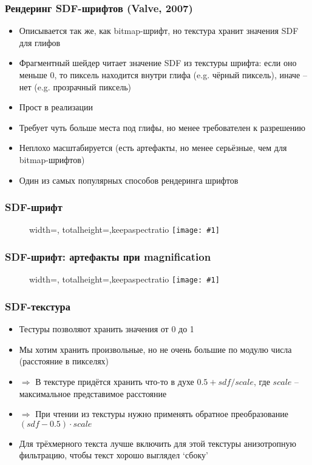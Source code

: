 \documentclass{beamer}
\newcommand{\slideimage}[1]{
  \begin{figure}
    \begin{adjustbox}{width=\textwidth, totalheight=\textheight-2\baselineskip-2\baselineskip,keepaspectratio}
      \texttt{[image: \#1]}
    \end{adjustbox}
  \end{figure}
}
\begin{document}
\begin{frame}[fragile]
\frametitle{Рендеринг SDF-шрифтов (Valve, 2007)}
\begin{itemize}
\item Описывается так же, как bitmap-шрифт, но текстура хранит значения SDF для глифов
\pause
\item Фрагментный шейдер читает значение SDF из текстуры шрифта: если оно меньше 0, то пиксель находится внутри глифа (e.g. чёрный пиксель), иначе -- нет (e.g. прозрачный пиксель)
\pause
\item Прост в реализации
\pause
\item Требует чуть больше места под глифы, но менее требователен к разрешению
\pause
\item Неплохо масштабируется (есть артефакты, но менее серьёзные, чем для bitmap-шрифтов)
\pause
\item Один из самых популярных способов рендеринга шрифтов
\end{itemize}
\end{frame}

\begin{frame}[fragile]
\frametitle{SDF-шрифт}
\slideimage{sdf-font.png}
\end{frame}

\begin{frame}[fragile]
\frametitle{SDF-шрифт: артефакты при magnification}
\slideimage{sdf-artifacts.jpg}
\end{frame}

\begin{frame}[fragile]
\frametitle{SDF-текстура}
\begin{itemize}
\item Тестуры позволяют хранить значения от 0 до 1
\pause
\item Мы хотим хранить произвольные, но не очень большие по модулю числа (расстояние в пикселях)
\pause
\item \begin{math}\Longrightarrow\end{math} В текстуре придётся хранить что-то в духе \begin{math}0.5 + sdf / scale\end{math}, где \begin{math}scale\end{math} -- максимальное представимое расстояние
\pause
\item \begin{math}\Longrightarrow\end{math} При чтении из текстуры нужно применять обратное преобразование \begin{math}(sdf - 0.5) \cdot scale\end{math}
\pause
\item Для трёхмерного текста лучше включить для этой текстуры анизотропную фильтрацию, чтобы текст хорошо выглядел `сбоку'
\end{itemize}
\end{frame}
\end{document}
